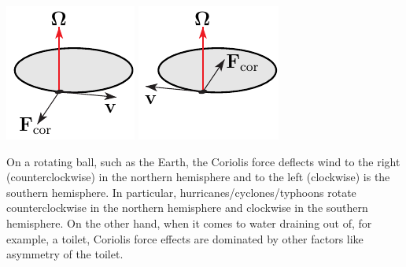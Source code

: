       \begin{efig} 
      \begin{center}
      \includegraphics{merryD.pdf}\qquad\qquad
      \includegraphics{merryE.pdf}
      \end{center}
      \end{efig}
On a rotating ball, such as the Earth, the Coriolis force deflects
wind to the right (counterclockwise) in the northern hemisphere
and to the left (clockwise) is the southern hemisphere. In particular,
hurricanes/cyclones/typhoons rotate counterclockwise in the northern
hemisphere and clockwise in the southern hemisphere. On the other
hand, when it comes to water draining out of, for example, a toilet,
Coriolis force effects are dominated by other factors like asymmetry 
of the toilet. 



